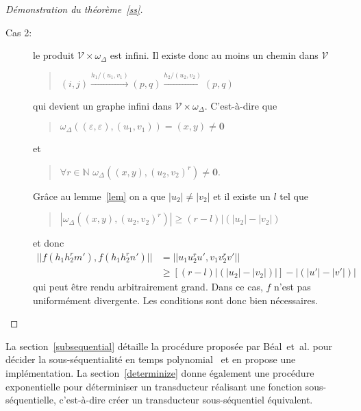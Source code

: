 \begin{proof}[Démonstration du théorème~\ref{ss}]
\begin{description}
	    	\item[Cas 2:] le produit $\mathscr{V} \times \omega_\Delta$ est infini. Il existe donc au moins un chemin dans $\mathscr{V}$
	    	\begin{quotation}
	    		$(i,j) \xrightarrow{h_1/(u_1,v_1)} (p,q) \xrightarrow{h_2/(u_2,v_2)} (p,q)$
	    	\end{quotation}
	    	qui devient un graphe infini dans $\mathscr{V} \times \omega_\Delta$. C'est-à-dire que \begin{quotation}
	    		$\omega_\Delta((\varepsilon,\varepsilon),(u_1,v_1)) = (x,y) \neq \mathbf{0}$
	    	\end{quotation}
	    	et 
	    	\begin{quotation}
		    	$\forall r \in \mathbb{N}$ $\omega_\Delta((x,y),(u_2,v_2)^r) \neq \mathbf{0}$.
		    \end{quotation}
		    Grâce au lemme~\ref{lem} on a que $|u_2| \neq |v_2|$ et il existe un $l$ tel que 
	    	\begin{quotation}
	    		$|\omega_\Delta((x,y),(u_2,v_2)^r)| \geq (r-l)|(|u_2|-|v_2|)$
	    	\end{quotation}
	    	et donc
	    	\begin{align*}
	    		||f(h_1h_2^rm'),f(h_1h_2^rn')|| &= ||u_1u_2^ru',v_1v_2^rv'|| \\
									    		&\geq \left[(r-l)|(|u_2|-|v_2|)|\right] - |(|u'|-|v'|)|
	    	\end{align*}
	    	qui peut être rendu arbitrairement grand. Dans ce cas, $f$ n'est pas uniformément divergente. Les conditions sont donc bien nécessaires.
	    \end{description}
    \end{proof}
    
    La section~\ref{subsequential} détaille la procédure proposée par Béal~et~al. pour décider la sous-séquentialité en temps polynomial~\cite{Bea03} et en propose une implémentation. La section~\ref{determinize} donne également une procédure exponentielle pour déterminiser un transducteur réalisant une fonction sous-séquentielle, c'est-à-dire créer un transducteur sous-séquentiel équivalent.